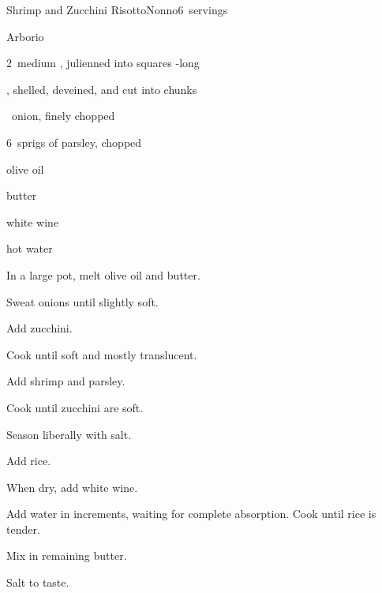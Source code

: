 \begin{recipe}{Shrimp and Zucchini Risotto}{Nonno}{6~servings}

\begin{ingredients}
\item {} Arborio 
\item 2~medium , julienned into \inch{\quarter} squares -long
\item {} , shelled, deveined, and cut into chunks
\item \half{}~onion, finely chopped
\item 6~sprigs of parsley, chopped
\item {} olive oil
\item {} butter
\item \C{\half} white wine
\item hot water
\end{ingredients}

\begin{directions}
\item In a large pot, melt olive oil and butter.
\item Sweat onions until slightly soft.
\item Add zucchini.
\item Cook until soft and mostly translucent.
\item Add shrimp and parsley.
\item Cook until zucchini are soft.
\item Season liberally with salt.
\item Add rice.
\item When dry, add white wine.
\item Add water in \C{\half} increments, waiting for complete absorption. Cook until rice is tender.
\item Mix in remaining butter.
\item Salt to taste.
\end{directions}

\end{recipe}
